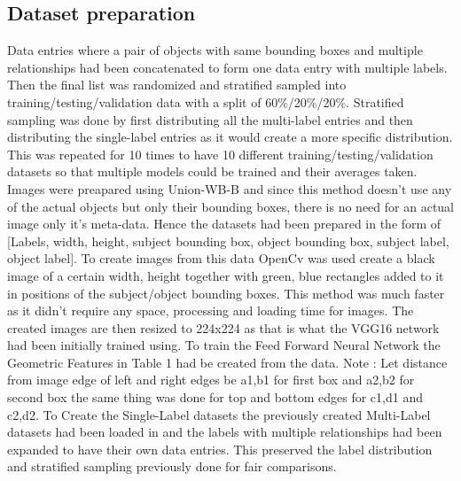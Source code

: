 \documentclass{IEEEtran}
\begin{document}
\subsection{Dataset preparation}
Data entries where a pair of objects with same bounding boxes and multiple relationships had been concatenated to form one data entry with multiple labels. Then the final list was randomized and stratified sampled into training/testing/validation data with a split of 60\%/20\%/20\%. Stratified sampling was done by first distributing all the multi-label entries and then distributing the single-label entries as it would create a more specific distribution. This was repeated for 10 times to have 10 different training/testing/validation datasets so that multiple models could be trained and their averages taken. Images were preapared using Union-WB-B and since this method doesn't use any of the actual objects but only their bounding boxes, there is no need for an actual image only it’s meta-data. Hence the datasets had been prepared in the form of [Labels, width, height, subject bounding box, object bounding box, subject label, object label]. To create images from this data OpenCv was used create a black image of a certain width, height together with green, blue rectangles added to it in positions of the subject/object bounding boxes. This method was much faster as it didn’t require any space, processing and loading time for images. The created images are then resized to 224x224 as that is what the VGG16 network had been initially trained using. To train the Feed Forward Neural Network the Geometric Features in Table 1 had be created from the data. Note : Let distance from image edge of left and right edges be a1,b1 for first box and a2,b2 for second box the same thing was done for top and bottom edges for c1,d1 and c2,d2. To Create the Single-Label datasets the previously created Multi-Label datasets had been loaded in and the labels with multiple relationships had been expanded to have their own data entries. This preserved the label distribution and stratified sampling previously done for fair comparisons.
\small
\end{document}
